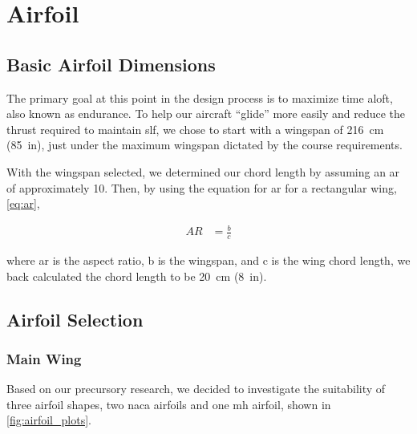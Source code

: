 \chapter{Airfoil}\label{cp:airfoil}

\section{Basic Airfoil Dimensions}

The primary goal at this point in the design process is to maximize time aloft, also known as endurance. To help our aircraft ``glide'' more easily and reduce the thrust required to maintain \acrfull{slf}, we chose to start with a wingspan of \qty{216}{\centi\meter} (\qty{85}{in}), just under the maximum wingspan dictated by the course requirements.

With the wingspan selected, we determined our chord length by assuming an \acrfull{ar} of approximately \num{10}. Then, by using the equation for \acrshort{ar} for a rectangular wing, \autoref{eq:ar},

\begin{align}
    AR &= \frac{b}{c}\label{eq:ar}
\end{align}

\noindent where \acrshort{ar} is the aspect ratio, \gls{b} is the wingspan, and \gls{c} is the wing chord length, we back calculated the chord length to be \qty{20}{\centi\meter} (\qty{8}{in}).

\newpage

\section{Airfoil Selection}

\subsection{Main Wing}

Based on our precursory research, we decided to investigate the suitability of three airfoil shapes, two \acrfull{naca} airfoils and one \acrfull{mh} airfoil, shown in \autoref{fig:airfoil_plots}.

